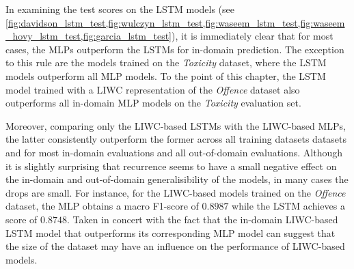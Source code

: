 In examining the test scores on the LSTM models (see \cref{fig:davidson_lstm_test,fig:wulczyn_lstm_test,fig:waseem_lstm_test,fig:waseem_hovy_lstm_test,fig:garcia_lstm_test}), it is immediately clear that for most cases, the MLPs outperform the LSTMs for in-domain prediction. The exception to this rule are the models trained on the \textit{Toxicity} dataset, where the LSTM models outperform all MLP models.
To the point of this chapter, the LSTM model trained with a LIWC representation of the \textit{Offence} dataset also outperforms all in-domain MLP models on the \textit{Toxicity} evaluation set.

Moreover, comparing only the LIWC-based LSTMs with the LIWC-based MLPs, the latter consistently outperform the former across all training datasets datasets and for most in-domain evaluations and all out-of-domain evaluations. Although it is slightly surprising that recurrence seems to have a small negative effect on the in-domain and out-of-domain generalisibility of the models, in many cases the drops are small. For instance, for the LIWC-based models trained on the \textit{Offence} dataset, the MLP obtains a macro F1-score of $0.8987$ while the LSTM achieves a score of $0.8748$. Taken in concert with the fact that the in-domain LIWC-based LSTM model that outperforms its corresponding MLP model can suggest that the size of the dataset may have an influence on the performance of LIWC-based models.

